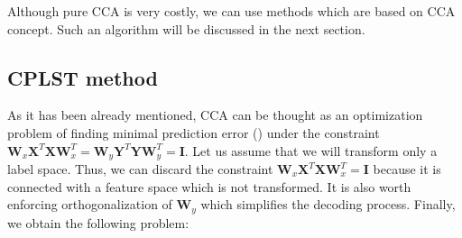 \documentclass[english,a4paper,twoside]{ppfcmthesis}
\begin{document}
Although pure CCA is very costly, we can use methods which are based on CCA concept. Such an algorithm will be discussed in the next section.

\subsection{CPLST method}\label{sec:cplst}

As it has been already mentioned, CCA can be thought as an optimization problem of finding minimal prediction error () under the constraint $\boldsymbol{W}_x\boldsymbol{X}^T\boldsymbol{X}\boldsymbol{W}_x^T=\boldsymbol{W}_y\boldsymbol{Y}^T\boldsymbol{Y}\boldsymbol{W}_y^T=\boldsymbol{I}$. Let us assume that we will transform only a label space. Thus, we can discard the constraint $\boldsymbol{W}_x\boldsymbol{X}^T\boldsymbol{X}\boldsymbol{W}_x^T=\boldsymbol{I}$ because it is connected with a feature space which is not transformed. It is also worth enforcing orthogonalization of $\boldsymbol{W}_y$  which simplifies the decoding process. Finally, we obtain the following problem:
\end{document}
